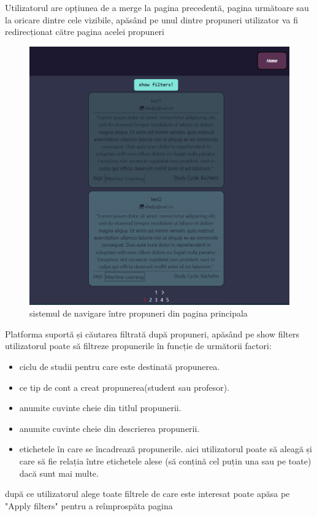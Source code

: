 \documentclass[12pt,a4paper,hidelinks]{report}
\theoremstyle{definition}
\theoremstyle{remark}
\begin{document}
Utilizatorul are opțiunea de a merge la pagina precedentă, pagina următoare sau la oricare dintre cele vizibile, apăsând 
pe unul dintre propuneri utilizator va fi redirecționat către pagina acelei propuneri
\begin{figure}[H]
    \centering
    \includegraphics[scale=0.5]{images/HomePage.PNG}
    \caption{sistemul de navigare între propuneri din pagina principala}
\end{figure}
Platforma suportă și căutarea filtrată după propuneri, apăsând pe show filters utilizatorul poate să filtreze propunerile 
în funcție de următorii factori:
\begin{itemize}
    \item ciclu de studii pentru care este destinată propunerea.
    \item ce tip de cont a creat propunerea(student sau profesor).
    \item anumite cuvinte cheie din titlul propunerii.
    \item anumite cuvinte cheie din descrierea propunerii.
    \item etichetele în care se încadrează propunerile.
    aici utilizatorul poate să aleagă și care să fie relația între etichetele alese (să conțină cel puțin una sau pe toate)
    dacă sunt mai multe.
\end{itemize}
    după ce utilizatorul alege toate filtrele de care este interesat poate apăsa pe "Apply filters" pentru a reîmprospăta pagina
\end{document}
